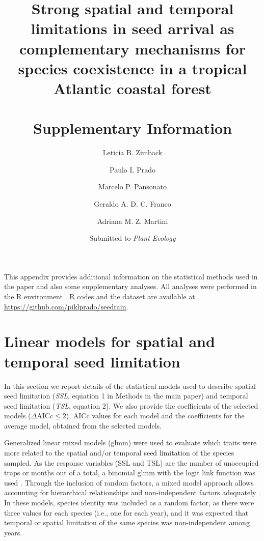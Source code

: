 \documentclass{article}
\begin{document}
\title{Strong spatial and temporal limitations in seed arrival as
  complementary mechanisms for species coexistence in a tropical
  Atlantic coastal forest \\ \ \\
  \Large Supplementary Information} 

\author[1,2]{Leticia B. Zimback}
\author[2]{Paulo I. Prado}
\author[2]{Marcelo P. Pansonato}
\author[3]{Geraldo A. D. C. Franco}
\author[2,4]{Adriana M. Z. Martini}



\date{Submitted to \emph{Plant Ecology}}

\maketitle

This appendix provides additional information on the statistical
methods used in the paper and also some supplementary analyses. All
analyses were performed in the R environment \cite{Rcore}.
R codes and the dataset are available at
\url{https://github.com/piklprado/seedrain}.


\section*{Linear models for spatial and temporal seed limitation}
\label{sec:model-select-aver}

In this section we report details of the statistical models used to
describe spatial seed limitation (\emph{SSL}, equation 1 in Methods in
the main paper) and temporal seed limitation (\emph{TSL}, equation
2). We also provide the coefficients of the selected models
($\Delta \mathrm{AICc} \leq 2$), $\mathrm{AICc}$ values for each model and the
coefficients for the average model, obtained from the selected models.


Generalized linear mixed models (glmm) were used to evaluate which
traits were more related to the spatial and/or temporal seed
limitation of the species sampled. As the response variables (SSL and
TSL) are the number of unoccupied traps or months out of a total, a
binomial glmm with the logit link function was used
\cite{bolker2009,dobson2018}. Through the inclusion of random factors,
a mixed model approach allows accounting for hierarchical
relationships and non-independent factors adequately
\cite{bolker2009,Zuur2009book}.  In these models, species identity was
included as a random factor, as there were three values for each
species (i.e., one for each year), and it was expected that temporal
or spatial limitation of the same species was non-independent among
years.
\end{document}
